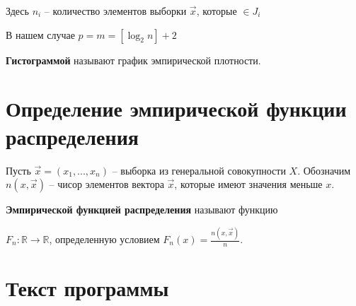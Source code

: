 \documentclass[a4paper,14pt]{extreport} %
\begin{document}
    Здесь $n_i$ -- количество элементов выборки $\vec x$, которые
    $\in J_i$
    
    \hfill
    
    В нашем случае $p=m=[\log_2n] +2$
    
    \hfill

\textbf{Гистограммой} называют график эмпирической плотности. 

\section{Определение эмпирической функции распределения}

\hfill 

Пусть $\vec x = (x_1, ..., x_n)$ -- выборка из генеральной совокупности $X$. Обозначим $n(x, \vec x)$ -- чисор элементов вектора $\vec x$, которые имеют значения меньше $x$.

\hfill

\textbf{Эмпирической функцией распределения} называют функцию 

$F_n : \mathbb{R} \to \mathbb{R}$, определенную условием $F_n(x) = \frac{n(x, \vec x)}{n}$. 

\section{Текст программы}

\hfill 
\end{document}
